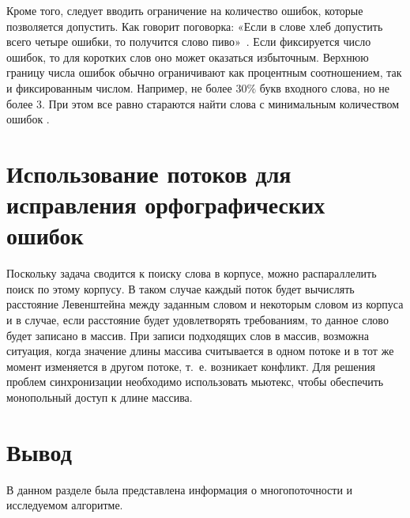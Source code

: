 Кроме того, следует вводить ограничение на количество ошибок, которые позволяется допустить. 
Как говорит поговорка: «Если в слове хлеб допустить всего четыре ошибки, то получится слово пиво»~\cite{miem}. 
Если фиксируется число ошибок, то для коротких слов оно может оказаться избыточным.
Верхнюю границу числа ошибок обычно ограничивают как процентным соотношением, так и фиксированным числом. 
Например, не более $30\%$ букв входного слова, но не более 3.
При этом все равно стараются найти слова с минимальным количеством ошибок \cite{miem}.

\section{Использование потоков для исправления орфографических ошибок}

Поскольку задача сводится к поиску слова в корпусе, можно распараллелить поиск по этому корпусу. 
В таком случае каждый поток будет вычислять расстояние Левенштейна между заданным словом и некоторым словом из корпуса и в случае, если расстояние будет удовлетворять требованиям, то данное слово будет записано в массив. 
При записи подходящих слов в массив, возможна ситуация, когда значение длины массива считывается в одном потоке и в тот же момент изменяется в другом потоке, т.~е. возникает конфликт. 
Для решения проблем синхронизации необходимо использовать мьютекс, чтобы обеспечить монопольный доступ к длине массива. 

\section*{Вывод} 
В данном разделе была представлена информация о многопоточности
и исследуемом алгоритме.